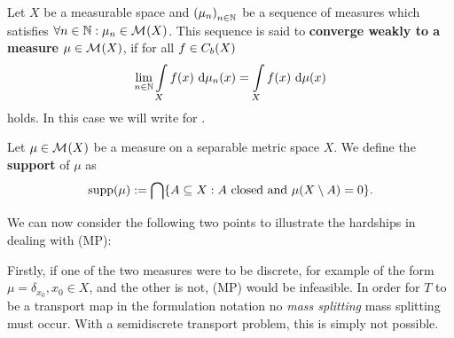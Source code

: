 
\begin{definition}\label{WeakConMeas}
	Let $X$ be a measurable space and ${(\mu_n)}_{\NinN}$ be a sequence of measures which satisfies $\forall \NinN: \mu_n \in \M{X}$. This sequence is said to \textbf{converge weakly to a measure} $\mu \in \M{X}$, if for all $f \in \CF[b]{X}$ 
	\[ \lim\limits_{\NinN} \int\limits_X f(x)~\Dx{\mu_n} = \int\limits_X f(x)~\Dx{\mu} \]
	holds. In this case we will write  for \Ninf{}.
\end{definition}

\begin{definition}\label{Supp}
	Let $\mu \in \M{X}$ be a measure on a separable metric space $X$. We define the \textbf{support} of $\mu$ as
	\[ \supp{\mu} := \bigcap \{ A \subseteq X : A \text{ closed and } \mu(X \setminus A) = 0 \}. \]
\end{definition}

We can now consider the following two points to illustrate the hardships in dealing with (MP):

Firstly, if one of the two measures were to be discrete, for example of the form $\mu = \delta_{x_0}, x_0 \in X$, and the other is not, (MP) would be infeasible. In order for $T$ to be a transport map in the formulation notation no \textit{mass splitting} mass splitting must occur. With a semidiscrete transport problem, this is simply not possible.


